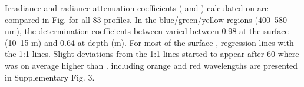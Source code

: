 \DIFdelend \DIFaddbegin {}\DIFaddend Irradiance and radiance \DIFaddbegin {}\DIFaddend attenuation coefficients (\ked{} and \DIFdelbegin %
\DIFdelend \DIFaddbegin \klu{}\DIFaddend ) calculated on \DIFdelbegin {}\DIFdelend \DIFaddbegin {}\DIFaddend are compared in Fig. \DIFdelbegin {}\DIFdelend \DIFaddbegin {}\DIFaddend for all 83 profiles. In the blue/green/yellow regions (400--580 nm), the determination coefficients between \DIFdelbegin %
\DIFdelend \DIFaddbegin \klu{} \ked{} \DIFaddend varied between 0.98 at the surface (10--15 m) and 0.64 at depth (\DIFdelbegin {}\DIFdelend \DIFaddbegin {}\DIFaddend m). For most of the surface \DIFdelbegin {}\DIFdelend \DIFaddbegin {}\DIFaddend , regression lines \DIFdelbegin {}\DIFdelend \DIFaddbegin {}\DIFaddend with the 1:1 lines. Slight deviations from the 1:1 lines started to appear after 60 \DIFdelbegin {}\DIFdelend \DIFaddbegin {}\DIFaddend where \ked{} was on average higher than \klu{}. \DIFdelbegin {}\DIFdelend \DIFaddbegin {}\DIFaddend including orange and red wavelengths are presented in Supplementary Fig. 3. \DIFdelbegin %

\subsection{}
\addtocounter{subsection}{-1}%

\subsubsection{}
\addtocounter{subsubsection}{-1}%

